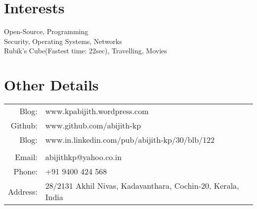 \documentclass[a4paper,10pt]{article} %
\begin{document}

\section{Interests}

\textsf{Open-Source, Programming\\
Security, Operating Systems, Networks\\
Rubik's Cube(Fastest time: 22sec), Travelling, Movies}


\section{Other Details}

\begin{tabular}{rl}
        \textsf{Blog:}    & \textsf{www.kpabijith.wordpress.com} \\
        \textsf{Github:}  & \textsf{www.github.com/abijith-kp} \\
        \textsf{Blog:}    & \textsf{www.in.linkedin.com/pub/abijith-kp/30/blb/122} \\ \\
        \textsf{Email:}   & \textsf{abijithkp@yahoo.co.in} \\
        \textsf{Phone:}   & +91 9400 424 568\\
        \textsf{Address:} & \textsf{28/2131 Akhil Nivas, Kadavanthara, Cochin-20, Kerala, India} \\
\end{tabular}
\end{document}
